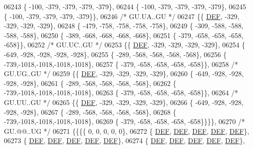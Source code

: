 \begin{DoxyCode}
06243 \{ -100, -379, -379, -379, -379\},
06244 \{ -100, -379, -379, -379, -379\},
06245 \{ -100, -379, -379, -379, -379\}\},
06246 \textcolor{comment}{/* GU.UA..GU */}
06247 \{\{  \mbox{\hyperlink{1_88_84__epars_8h_a397419fc12b37ed479c8abb9d444d843}{DEF}}, -329, -329, -329, -329\},
06248 \{ -479, -758, -758, -758, -758\},
06249 \{ -309, -588, -588, -588, -588\},
06250 \{ -389, -668, -668, -668, -668\},
06251 \{ -379, -658, -658, -658, -658\}\},
06252 \textcolor{comment}{/* GU.UC..GU */}
06253 \{\{  \mbox{\hyperlink{1_88_84__epars_8h_a397419fc12b37ed479c8abb9d444d843}{DEF}}, -329, -329, -329, -329\},
06254 \{ -649, -928, -928, -928, -928\},
06255 \{ -289, -568, -568, -568, -568\},
06256 \{ -739,-1018,-1018,-1018,-1018\},
06257 \{ -379, -658, -658, -658, -658\}\},
06258 \textcolor{comment}{/* GU.UG..GU */}
06259 \{\{  \mbox{\hyperlink{1_88_84__epars_8h_a397419fc12b37ed479c8abb9d444d843}{DEF}}, -329, -329, -329, -329\},
06260 \{ -649, -928, -928, -928, -928\},
06261 \{ -289, -568, -568, -568, -568\},
06262 \{ -739,-1018,-1018,-1018,-1018\},
06263 \{ -379, -658, -658, -658, -658\}\},
06264 \textcolor{comment}{/* GU.UU..GU */}
06265 \{\{  \mbox{\hyperlink{1_88_84__epars_8h_a397419fc12b37ed479c8abb9d444d843}{DEF}}, -329, -329, -329, -329\},
06266 \{ -649, -928, -928, -928, -928\},
06267 \{ -289, -568, -568, -568, -568\},
06268 \{ -739,-1018,-1018,-1018,-1018\},
06269 \{ -379, -658, -658, -658, -658\}\}\}\},
06270 \textcolor{comment}{/* GU.@@..UG */}
06271 \{\{\{\{    0,    0,    0,    0,    0\},
06272 \{  \mbox{\hyperlink{1_88_84__epars_8h_a397419fc12b37ed479c8abb9d444d843}{DEF}},  \mbox{\hyperlink{1_88_84__epars_8h_a397419fc12b37ed479c8abb9d444d843}{DEF}},  \mbox{\hyperlink{1_88_84__epars_8h_a397419fc12b37ed479c8abb9d444d843}{DEF}},  \mbox{\hyperlink{1_88_84__epars_8h_a397419fc12b37ed479c8abb9d444d843}{DEF}},  \mbox{\hyperlink{1_88_84__epars_8h_a397419fc12b37ed479c8abb9d444d843}{DEF}}\},
06273 \{  \mbox{\hyperlink{1_88_84__epars_8h_a397419fc12b37ed479c8abb9d444d843}{DEF}},  \mbox{\hyperlink{1_88_84__epars_8h_a397419fc12b37ed479c8abb9d444d843}{DEF}},  \mbox{\hyperlink{1_88_84__epars_8h_a397419fc12b37ed479c8abb9d444d843}{DEF}},  \mbox{\hyperlink{1_88_84__epars_8h_a397419fc12b37ed479c8abb9d444d843}{DEF}},  \mbox{\hyperlink{1_88_84__epars_8h_a397419fc12b37ed479c8abb9d444d843}{DEF}}\},
06274 \{  \mbox{\hyperlink{1_88_84__epars_8h_a397419fc12b37ed479c8abb9d444d843}{DEF}},  \mbox{\hyperlink{1_88_84__epars_8h_a397419fc12b37ed479c8abb9d444d843}{DEF}},  \mbox{\hyperlink{1_88_84__epars_8h_a397419fc12b37ed479c8abb9d444d843}{DEF}},  \mbox{\hyperlink{1_88_84__epars_8h_a397419fc12b37ed479c8abb9d444d843}{DEF}},  \mbox{\hyperlink{1_88_84__epars_8h_a397419fc12b37ed479c8abb9d444d843}{DEF}}\},

\end{DoxyCode}
